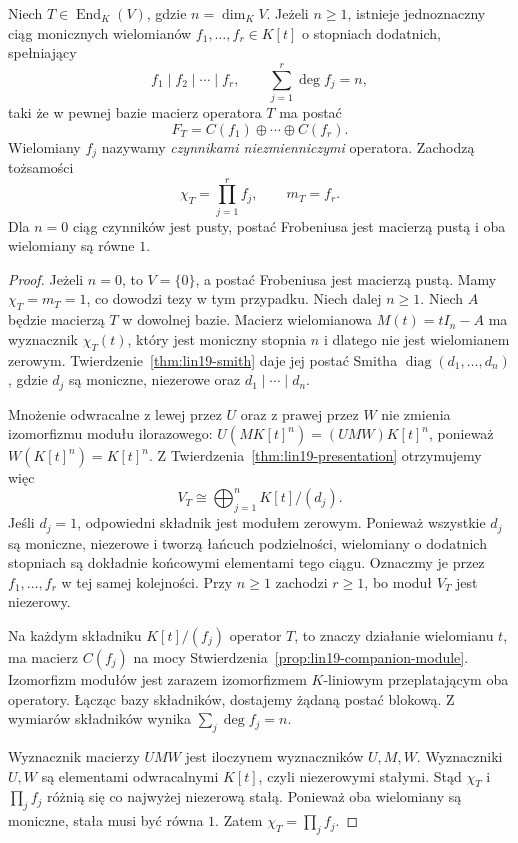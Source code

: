 \begin{twierdzenie}
\label{thm:lin19-frobenius}
Niech \(T\in\operatorname{End}_K(V)\),
gdzie \(n=\dim_K V\).
Jeżeli \(n\ge1\), istnieje jednoznaczny ciąg
monicznych wielomianów
\(f_1,\ldots,f_r\in K[t]\)
o stopniach dodatnich, spełniający
\[
 f_1\mid f_2\mid\cdots\mid f_r,
 \qquad
 \sum_{j=1}^{r}\deg f_j=n,
\]
taki że w pewnej bazie macierz
operatora \(T\) ma postać
\[
 F_T=C(f_1)\oplus\cdots\oplus C(f_r).
\]
Wielomiany \(f_j\) nazywamy
\emph{czynnikami niezmienniczymi} operatora.
Zachodzą tożsamości
\[
 \chi_T=\prod_{j=1}^r f_j,
 \qquad m_T=f_r.
\]
Dla \(n=0\) ciąg czynników jest pusty,
postać Frobeniusa jest macierzą pustą
i oba wielomiany są równe \(1\).
\end{twierdzenie}
\begin{proof}
Jeżeli \(n=0\), to \(V=\{0\}\),
a postać Frobeniusa jest macierzą pustą.
Mamy \(\chi_T=m_T=1\), co dowodzi tezy
w tym przypadku.
Niech dalej \(n\ge1\).
Niech \(A\) będzie macierzą \(T\)
w dowolnej bazie.
Macierz wielomianowa \(M(t)=tI_n-A\)
ma wyznacznik \(\chi_T(t)\),
który jest moniczny stopnia \(n\)
i dlatego nie jest wielomianem zerowym.
Twierdzenie~\ref{thm:lin19-smith}
daje jej postać Smitha
\(\operatorname{diag}(d_1,\ldots,d_n)\),
gdzie \(d_j\) są moniczne,
niezerowe oraz \(d_1\mid\cdots\mid d_n\).

Mnożenie odwracalne z lewej przez \(U\)
oraz z prawej przez \(W\)
nie zmienia izomorfizmu modułu ilorazowego:
\(U(MK[t]^n)=(UMW)K[t]^n\),
ponieważ \(W(K[t]^n)=K[t]^n\).
Z Twierdzenia~\ref{thm:lin19-presentation}
otrzymujemy więc
\[
 V_T\cong
 \bigoplus_{j=1}^n K[t]/(d_j).
\]
Jeśli \(d_j=1\), odpowiedni składnik
jest modułem zerowym.
Ponieważ wszystkie \(d_j\) są moniczne,
niezerowe i tworzą łańcuch podzielności,
wielomiany o dodatnich stopniach
są dokładnie końcowymi elementami tego ciągu.
Oznaczmy je przez \(f_1,\ldots,f_r\)
w tej samej kolejności.
Przy \(n\ge1\) zachodzi \(r\ge1\),
bo moduł \(V_T\) jest niezerowy.

Na każdym składniku \(K[t]/(f_j)\)
operator \(T\), to znaczy
działanie wielomianu \(t\),
ma macierz \(C(f_j)\)
na mocy Stwierdzenia~\ref{prop:lin19-companion-module}.
Izomorfizm modułów jest zarazem
izomorfizmem \(K\)-liniowym
przeplatającym oba operatory.
Łącząc bazy składników,
dostajemy żądaną postać blokową.
Z wymiarów składników wynika
\(\sum_j\deg f_j=n\).

Wyznacznik macierzy \(UMW\)
jest iloczynem wyznaczników \(U,M,W\).
Wyznaczniki \(U,W\) są elementami
odwracalnymi \(K[t]\), czyli
niezerowymi stałymi.
Stąd \(\chi_T\) i \(\prod_jf_j\)
różnią się co najwyżej niezerową stałą.
Ponieważ oba wielomiany są moniczne,
stała musi być równa \(1\).
Zatem \(\chi_T=\prod_jf_j\).


\end{proof}
